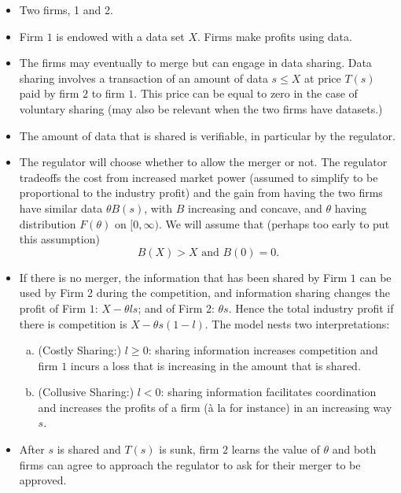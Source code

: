 \documentclass[a4paper]{article}
\renewcommand{\t}{\theta}
\begin{document}
\begin{itemize}\setlength\itemsep{0em}
	\item Two firms, 1 and 2. 
	\item Firm $1$ is endowed with a data set $X$. Firms make profits using data. 
	\item The firms may eventually to merge but can engage in data sharing. Data sharing involves a transaction of an amount of data $s\leq X$ at price $T(s)$ paid by firm $2$ to firm $1$. This price can be equal to zero in the case of voluntary sharing (may also be relevant when the two firms have datasets.)
	\item The amount of data that is shared is verifiable, in particular by the regulator. 
	\item The regulator will choose whether to allow the merger or not. The regulator tradeoffs the cost from increased market power (assumed to simplify to be proportional to the industry profit) and the gain from having the two firms have similar data $\t B(s)$, with $B$ increasing and concave, and $\t$ having distribution $F(\t)$ on $[0,\infty)$. We will assume that (perhaps too early to put this assumption)
   \begin{equation}\label{ass:B}
       B(X)>X \text{ and } B(0)=0.
   \end{equation}
	\item If there is no merger, the information that has been shared by Firm $1$ can be used by Firm 2 during the competition, and information sharing changes the profit of Firm $1$: $X-\t l s$; and of Firm 2: $\t s$. Hence the total industry profit if there is competition is $X-\t s(1-l)$. The model nests two interpretations:
\begin{enumerate}[(a)]
    \item (Costly Sharing:) $l\geq 0$: sharing information increases competition and firm $1$ incurs a loss that is increasing in the amount that is shared.
    \item (Collusive Sharing:) $l< 0$: sharing information facilitates coordination and increases the profits of a firm (à la \cite{vives1984duopoly} for instance) in an increasing way $s$.
 \end{enumerate}
    \item After $s$ is shared and $T(s)$ is sunk, firm $2$ learns the value of $\t$ and both firms can agree to approach the regulator to ask for their merger to be approved. 
    
\end{itemize}
\end{document}
